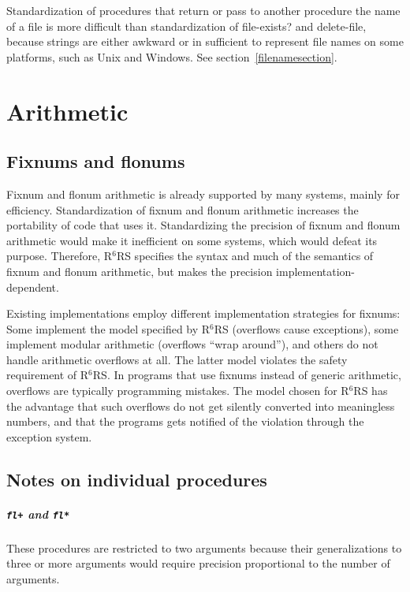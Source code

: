 \documentclass[twoside,twocolumn]{algol60}
\newcommand{\rn}[1]{R$^{#1}$RS}
\begin{document}
Standardization of procedures that return or pass to another procedure
the name of a file is more difficult than standardization of {\cf
  file-exists?} and {\cf delete-file}, because strings are either
awkward or in sufficient to represent file names on some platforms,
such as Unix and Windows.  See section~\ref{filenamesection}.

\chapter{Arithmetic}

\section{Fixnums and flonums}

Fixnum and flonum arithmetic is already supported by many systems,
mainly for efficiency. Standardization of fixnum and flonum arithmetic
increases the portability of code that uses it.  Standardizing the
precision of fixnum and flonum arithmetic would make it inefficient on
some systems, which would defeat its purpose.  Therefore, \rn{6}
specifies the syntax and much of the semantics of fixnum and flonum
arithmetic, but makes the precision implementation-dependent.

Existing implementations employ different implementation strategies
for fixnums: Some implement the model specified by \rn{6} (overflows
cause exceptions), some implement modular arithmetic (overflows ``wrap
around''), and others do not handle arithmetic overflows at all.  The
latter model violates the safety requirement of \rn{6}.  In programs
that use fixnums instead of generic arithmetic, overflows are
typically programming mistakes.  The model chosen for \rn{6} has the
advantage that such overflows do not get silently converted into
meaningless numbers, and that the programs gets notified of the
violation through the exception system.

\section{Notes on individual procedures}

\paragraph{{\tt fl+} and {\tt fl*}}

These procedures are restricted to two arguments because their
generalizations to three or more arguments would require
precision proportional to the number of arguments.
\end{document}
